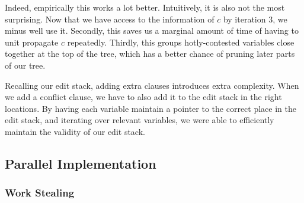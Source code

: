 \documentclass{article}
\begin{document}
Indeed, empirically this works a lot better.
Intuitively, it is also not the most surprising.
Now that we have access to the information of $c$ by iteration 3, we minus well use it.
Secondly, this saves us a marginal amount of time of having to unit propagate $c$ repeatedly.
Thirdly, this groups hotly-contested variables close together at the top of the tree, which has a better chance of pruning later parts of our tree.

Recalling our edit stack, adding extra clauses introduces extra complexity.
When we add a conflict clause, we have to also add it to the edit stack in the right locations.
By having each variable maintain a pointer to the correct place in the edit stack, and iterating over relevant variables, we were able to efficiently maintain the validity of our edit stack.

\subsection{Parallel Implementation}

\subsubsection{Work Stealing}
\end{document}
